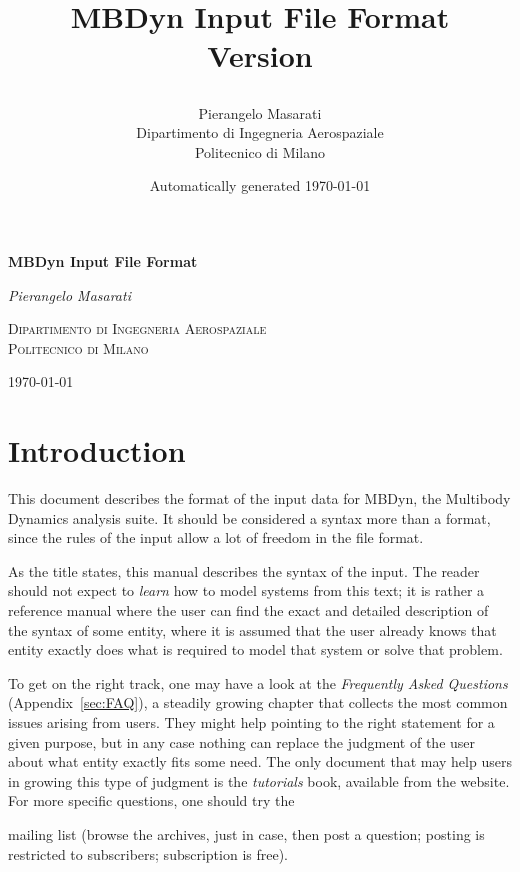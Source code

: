 \documentclass[10pt,dvips]{report}
\begin{document}
\begin{latexonly}
\title{\bf MBDyn Input File Format \\
Version

}
\author{Pierangelo Masarati \vspace{5mm}\\
    \sc Dipartimento di Ingegneria Aerospaziale \\
    \sc Politecnico di Milano}
\date{Automatically generated \today}
\maketitle
\end{latexonly}

\begin{htmlonly}
\begin{center}
\textbf{\LARGE MBDyn Input File Format}

\emph{\large Pierangelo Masarati}

\textsc{Dipartimento di Ingegneria Aerospaziale \\ Politecnico di Milano}

\today
\end{center}
\end{htmlonly}

\pagestyle{plain}

\tableofcontents
\newpage
\listoffigures
\newpage
\listoftables
\newpage

\chapter*{Introduction}
This document describes the format of the input data for MBDyn,
the Multibody Dynamics analysis suite.
It should be considered a syntax more than a format, since the rules of the
input allow a lot of freedom in the file format. 

As the title states, this manual describes the syntax of the input.
The reader should not expect to \emph{learn} how to model systems
from this text; it is rather a reference manual where the user
can find the exact and detailed description of the syntax of some
entity, where it is assumed that the user already knows that entity
exactly does what is required to model that system or solve that problem.

To get on the right track, one may have a look at the 
\emph{Frequently Asked Questions} (Appendix~\ref{sec:FAQ}),
a steadily growing chapter that collects the most common issues
arising from users.
They might help pointing to the right statement for a given purpose,
but in any case nothing can replace the judgment of the user
about what entity exactly fits some need.
The only document that may help users in growing this type of judgment
is the \emph{tutorials} book, available from the website.
For more specific questions, one should try the
\begin{quote}
\end{quote}
mailing list (browse the archives, just in case, then post a question;
posting is restricted to subscribers; subscription is free).
\end{document}
